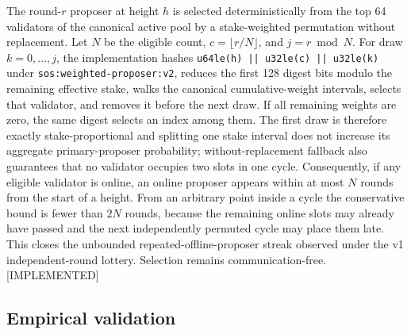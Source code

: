 \documentclass[11pt]{article}
\newcommand{\code}[1]{\texttt{#1}}
\newcommand{\statusI}{\textcolor{statgreen}{\textsf{\scriptsize[IMPLEMENTED]}}}
\theoremstyle{plain}
\theoremstyle{definition}
\theoremstyle{remark}
\begin{document}
The round-$r$ proposer at height $h$ is selected deterministically from the
top 64 validators of the canonical active pool by a stake-weighted permutation
without replacement. Let $N$ be the eligible count, $c=\lfloor r/N\rfloor$,
and $j=r\bmod N$. For draw $k=0,\ldots,j$, the implementation hashes
\code{u64le(h) || u32le(c) || u32le(k)} under
\code{sos:weighted-proposer:v2}, reduces the first 128 digest bits modulo the
remaining effective stake, walks the canonical cumulative-weight intervals,
selects that validator, and removes it before the next draw. If all remaining
weights are zero, the same digest selects an index among them. The first draw
is therefore exactly stake-proportional and splitting one stake interval does
not increase its aggregate primary-proposer probability; without-replacement
fallback also guarantees that no validator occupies two slots in one cycle.
Consequently, if any eligible validator is online, an online proposer appears
within at most $N$ rounds from the start of a height. From an arbitrary point
inside a cycle the conservative bound is fewer than $2N$ rounds, because the
remaining online slots may already have passed and the next independently
permuted cycle may place them late. This closes the unbounded
repeated-offline-proposer streak observed under the v1 independent-round lottery. Selection remains
communication-free. \statusI{}

\subsection{Empirical validation}
\label{sec:consensus-eval}
\end{document}
